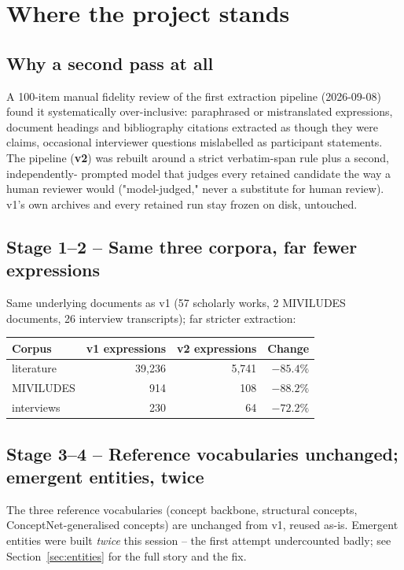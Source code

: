\documentclass[11pt,a4paper]{article}
\newcommand{\jargon}[1]{\textbf{#1}}
\begin{document}
\section{Where the project stands}
\label{sec:stages}

\subsection{Why a second pass at all}
A 100-item manual fidelity review of the first extraction pipeline
(2026-09-08) found it systematically over-inclusive: paraphrased or
mistranslated expressions, document headings and bibliography citations
extracted as though they were claims, occasional interviewer questions
mislabelled as participant statements. The pipeline (\jargon{v2}) was
rebuilt around a strict verbatim-span rule plus a second, independently-
prompted model that judges every retained candidate the way a human
reviewer would ("model-judged," never a substitute for human review).
v1's own archives and every retained run stay frozen on disk, untouched.

\subsection{Stage 1--2 -- Same three corpora, far fewer expressions}
Same underlying documents as v1 (57 scholarly works, 2 MIVILUDES
documents, 26 interview transcripts); far stricter extraction:

\begin{table}[h!]
\centering
\begin{tabular}{lrrr}
\toprule
Corpus & v1 expressions & v2 expressions & Change \\
\midrule
literature & 39{,}236 & 5{,}741 & $-85.4\%$ \\
MIVILUDES & 914 & 108 & $-88.2\%$ \\
interviews & 230 & 64 & $-72.2\%$ \\
\bottomrule
\end{tabular}
\end{table}

\subsection{Stage 3--4 -- Reference vocabularies unchanged; emergent entities, twice}
The three reference vocabularies (concept backbone, structural concepts,
ConceptNet-generalised concepts) are unchanged from v1, reused as-is.
Emergent entities were built \emph{twice} this session -- the first
attempt undercounted badly; see Section~\ref{sec:entities} for the full
story and the fix.
\end{document}
